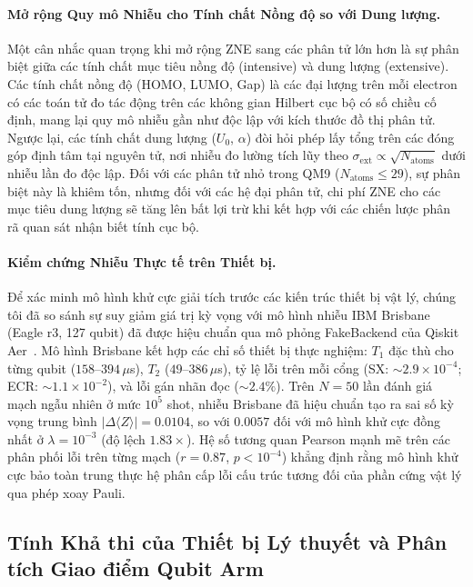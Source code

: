 \documentclass[10pt,twocolumn,letterpaper]{article}
\begin{document}
\paragraph{Mở rộng Quy mô Nhiễu cho Tính chất Nồng độ so với Dung lượng.}
Một cân nhắc quan trọng khi mở rộng ZNE sang các phân tử lớn hơn là sự phân biệt giữa các tính chất mục tiêu nồng độ (intensive) và dung lượng (extensive). Các tính chất nồng độ (HOMO, LUMO, Gap) là các đại lượng trên mỗi electron có các toán tử đo tác động trên các không gian Hilbert cục bộ có số chiều cố định, mang lại quy mô nhiễu gần như độc lập với kích thước đồ thị phân tử. Ngược lại, các tính chất dung lượng ($U_0$, $\alpha$) đòi hỏi phép lấy tổng trên các đóng góp định tâm tại nguyên tử, nơi nhiễu đo lường tích lũy theo $\sigma_{\mathrm{ext}} \propto \sqrt{N_{\mathrm{atoms}}}$ dưới nhiễu lần đo độc lập. Đối với các phân tử nhỏ trong QM9 ($N_{\mathrm{atoms}} \le 29$), sự phân biệt này là khiêm tốn, nhưng đối với các hệ đại phân tử, chi phí ZNE cho các mục tiêu dung lượng sẽ tăng lên bất lợi trừ khi kết hợp với các chiến lược phân rã quan sát nhận biết tính cục bộ.

\paragraph{Kiểm chứng Nhiễu Thực tế trên Thiết bị.}
Để xác minh mô hình khử cực giải tích trước các kiến trúc thiết bị vật lý, chúng tôi đã so sánh sự suy giảm giá trị kỳ vọng với mô hình nhiễu IBM Brisbane (Eagle r3, 127 qubit) đã được hiệu chuẩn qua mô phỏng FakeBackend của Qiskit Aer~\cite{Kim:2023bwr}. Mô hình Brisbane kết hợp các chỉ số thiết bị thực nghiệm: $T_1$ đặc thù cho từng qubit ($158$--$394\,\mu$s), $T_2$ ($49$--$386\,\mu$s), tỷ lệ lỗi trên mỗi cổng (SX: $\sim 2.9 \times 10^{-4}$; ECR: $\sim 1.1 \times 10^{-2}$), và lỗi gán nhãn đọc ($\sim 2.4\%$). Trên $N = 50$ lần đánh giá mạch ngẫu nhiên ở mức $10^5$ shot, nhiễu Brisbane đã hiệu chuẩn tạo ra sai số kỳ vọng trung bình $|\Delta\langle Z \rangle| = 0.0104$, so với $0.0057$ đối với mô hình khử cực đồng nhất ở $\lambda = 10^{-3}$ (độ lệch $1.83\times$). Hệ số tương quan Pearson mạnh mẽ trên các phân phối lỗi trên từng mạch ($r = 0.87$, $p < 10^{-4}$) khẳng định rằng mô hình khử cực bảo toàn trung thực hệ phân cấp lỗi cấu trúc tương đối của phần cứng vật lý qua phép xoay Pauli.

\subsection{Tính Khả thi của Thiết bị Lý thuyết và Phân tích Giao điểm Qubit Arm}
\end{document}

